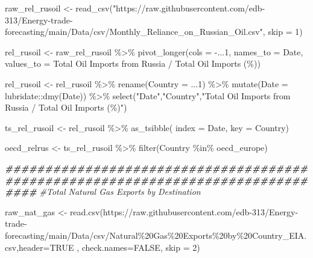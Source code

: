 \documentclass[
]{article}
\newenvironment{Shaded}{\begin{snugshade}}{\end{snugshade}}
\newcommand{\AttributeTok}[1]{\textcolor[rgb]{0.77,0.63,0.00}{#1}}
\newcommand{\CommentTok}[1]{\textcolor[rgb]{0.56,0.35,0.01}{\textit{#1}}}
\newcommand{\ConstantTok}[1]{\textcolor[rgb]{0.00,0.00,0.00}{#1}}
\newcommand{\DecValTok}[1]{\textcolor[rgb]{0.00,0.00,0.81}{#1}}
\newcommand{\DocumentationTok}[1]{\textcolor[rgb]{0.56,0.35,0.01}{\textbf{\textit{#1}}}}
\newcommand{\FunctionTok}[1]{\textcolor[rgb]{0.00,0.00,0.00}{#1}}
\newcommand{\NormalTok}[1]{#1}
\newcommand{\OtherTok}[1]{\textcolor[rgb]{0.56,0.35,0.01}{#1}}
\newcommand{\SpecialCharTok}[1]{\textcolor[rgb]{0.00,0.00,0.00}{#1}}
\newcommand{\StringTok}[1]{\textcolor[rgb]{0.31,0.60,0.02}{#1}}
\begin{document}
\begin{Shaded}
\begin{Highlighting}[]
\NormalTok{raw\_rel\_rusoil }\OtherTok{\textless{}{-}} \FunctionTok{read\_csv}\NormalTok{(}\StringTok{"https://raw.githubusercontent.com/edb{-}313/Energy{-}trade{-}forecasting/main/Data/csv/Monthly\_Reliance\_on\_Russian\_Oil.csv"}\NormalTok{, }\AttributeTok{skip =} \DecValTok{1}\NormalTok{)}

\NormalTok{rel\_rusoil }\OtherTok{\textless{}{-}}\NormalTok{ raw\_rel\_rusoil }\SpecialCharTok{\%\textgreater{}\%} 
  \FunctionTok{pivot\_longer}\NormalTok{(}\AttributeTok{cols =} \SpecialCharTok{{-}}\NormalTok{...}\DecValTok{1}\NormalTok{,}
               \AttributeTok{names\_to =} \StringTok{\textquotesingle{}Date\textquotesingle{}}\NormalTok{,}
               \AttributeTok{values\_to =} \StringTok{\textquotesingle{}Total Oil Imports from Russia / Total Oil Imports (\%)\textquotesingle{}}\NormalTok{)}

\NormalTok{rel\_rusoil }\OtherTok{\textless{}{-}}\NormalTok{ rel\_rusoil }\SpecialCharTok{\%\textgreater{}\%} 
  \FunctionTok{rename}\NormalTok{(}\AttributeTok{Country =}\NormalTok{ ...}\DecValTok{1}\NormalTok{) }\SpecialCharTok{\%\textgreater{}\%} 
  \FunctionTok{mutate}\NormalTok{(}\AttributeTok{Date =}\NormalTok{ lubridate}\SpecialCharTok{::}\FunctionTok{dmy}\NormalTok{(Date)) }\SpecialCharTok{\%\textgreater{}\%} 
  \FunctionTok{select}\NormalTok{(}\StringTok{"Date"}\NormalTok{,}\StringTok{"Country"}\NormalTok{,}\StringTok{"Total Oil Imports from Russia / Total Oil Imports (\%)"}\NormalTok{)}


\NormalTok{ts\_rel\_rusoil }\OtherTok{\textless{}{-}}\NormalTok{ rel\_rusoil }\SpecialCharTok{\%\textgreater{}\%} 
  \FunctionTok{as\_tsibble}\NormalTok{(}
    \AttributeTok{index =}\NormalTok{ Date,}
    \AttributeTok{key =}\NormalTok{ Country)}

\NormalTok{oecd\_relrus }\OtherTok{\textless{}{-}}\NormalTok{ ts\_rel\_rusoil }\SpecialCharTok{\%\textgreater{}\%}
  \FunctionTok{filter}\NormalTok{(Country }\SpecialCharTok{\%in\%}\NormalTok{ oecd\_europe)}

\DocumentationTok{\#\#\#\#\#\#\#\#\#\#\#\#\#\#\#\#\#\#\#\#\#\#\#\#\#\#\#\#\#\#\#\#\#\#\#\#\#\#\#\#\#\#\#\#\#\#\#\#\#\#\#\#\#\#\#\#\#\#\#\#\#\#\#\#\#\#\#\#\#\#\#\#\#\#\#\#\#\#\#\#}
\CommentTok{\#Total Natural Gas Exports by Destination}

\NormalTok{raw\_nat\_gas }\OtherTok{\textless{}{-}} \FunctionTok{read.csv}\NormalTok{(}\StringTok{\textquotesingle{}https://raw.githubusercontent.com/edb{-}313/Energy{-}trade{-}forecasting/main/Data/csv/Natural\%20Gas\%20Exports\%20by\%20Country\_EIA.csv\textquotesingle{}}\NormalTok{,}\AttributeTok{header=}\ConstantTok{TRUE}\NormalTok{ , }\AttributeTok{check.names=}\ConstantTok{FALSE}\NormalTok{, }\AttributeTok{skip =} \DecValTok{2}\NormalTok{)}


\end{Highlighting}
\end{Shaded}
\end{document}
